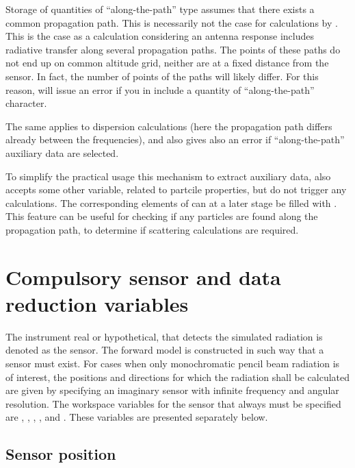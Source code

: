 Storage of quantities of ``along-the-path'' type assumes that there exists a
common propagation path. This is necessarily not the case for calculations by
. This is the case as a calculation considering an antenna
response includes radiative transfer along several propagation paths. The
points of these paths do not end up on common altitude grid, neither are at a
fixed distance from the sensor. In fact, the number of points of the paths will
likely differ. For this reason,  will issue an error if you
in  include a quantity of ``along-the-path'' character.

The same applies to dispersion calculations (here the propagation path differs
already between the frequencies), and also  gives
also an error if ``along-the-path'' auxiliary data are selected.

To simplify the practical usage this mechanism to extract auxiliary data,
 also accepts some other variable, related to
partcile properties, but do not trigger any calculations. The corresponding
elements of  can at a later stage be filled with
. This feature can be useful for
checking if any particles are found along the propagation path, to determine if
scattering calculations are required.


\section{Compulsory sensor and data reduction variables}
\label{sec:fm_defs:sensor1}

The instrument real or hypothetical, that detects the simulated radiation is
denoted as the sensor. The forward model is constructed in
such way that a sensor must exist. For cases when only monochromatic pencil
beam radiation is of interest, the positions and directions for which the
radiation shall be calculated are given by specifying an imaginary sensor with
infinite frequency and angular resolution. The workspace variables for the
sensor that always must be specified are ,
, , ,
 and . These
variables are presented separately below.


\subsection{Sensor position}
\label{sec:fm_defs:sensorpos}

